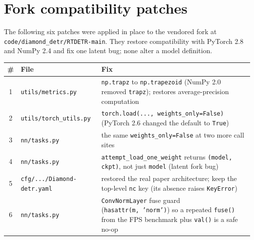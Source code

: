 \documentclass[11pt,a4paper]{article}
\begin{document}
\section{Fork compatibility patches}\label{app:patches}
The following six patches were applied in place to the vendored fork at
\texttt{code/diamond\_detr/RTDETR-main}. They restore compatibility with PyTorch 2.8 and NumPy 2.4
and fix one latent bug; none alter a model definition.

\begin{table}[H]
\centering
\small
\renewcommand{\arraystretch}{1.25}
\begin{tabularx}{\textwidth}{c l X}
\toprule
\textbf{\#} & \textbf{File} & \textbf{Fix} \\
\midrule
1 & \texttt{utils/metrics.py} & \texttt{np.trapz} to \texttt{np.trapezoid} (NumPy 2.0 removed \texttt{trapz}); restores average-precision computation \\
2 & \texttt{utils/torch\_utils.py} & \texttt{torch.load(..., weights\_only=False)} (PyTorch 2.6 changed the default to \texttt{True}) \\
3 & \texttt{nn/tasks.py} & the same \texttt{weights\_only=False} at two more call sites \\
4 & \texttt{nn/tasks.py} & \texttt{attempt\_load\_one\_weight} returns \texttt{(model, ckpt)}, not just \texttt{model} (latent fork bug) \\
5 & \texttt{cfg/.../Diamond-detr.yaml} & restored the real paper architecture; keep the top-level \texttt{nc} key (its absence raises \texttt{KeyError}) \\
6 & \texttt{nn/tasks.py} & \texttt{ConvNormLayer} fuse guard (\texttt{hasattr(m,\,'norm')}) so a repeated \texttt{fuse()} from the FPS benchmark plus \texttt{val()} is a safe no-op \\
\bottomrule
\end{tabularx}
\end{table}
\end{document}
